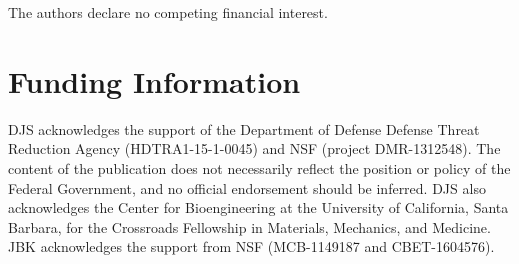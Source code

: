 \documentclass[9pt,bestpractices,pubversion]{livecoms}
\begin{document}
The authors declare no competing financial interest.


\section{Funding Information}
DJS acknowledges the support of the Department of Defense Defense Threat Reduction Agency (HDTRA1-15-1-0045) and NSF (project DMR-1312548).
The content of the publication does not necessarily reflect the position or policy of the Federal Government, and no official endorsement should be inferred.
DJS also acknowledges the Center for Bioengineering at the University of California, Santa Barbara, for the Crossroads Fellowship in Materials, Mechanics, and Medicine.
JBK acknowledges the support from NSF (MCB-1149187 and CBET-1604576).

\medskip

%



\end{document}
